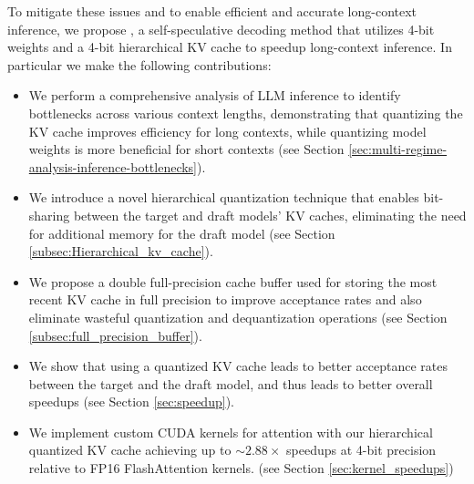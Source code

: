 To mitigate these issues and to enable efficient and accurate long-context inference, we propose \OURS, a self-speculative decoding method that utilizes 4-bit weights and a 4-bit hierarchical KV cache to speedup long-context inference. In particular we make the following contributions: 
\begin{itemize}
    \item We perform a comprehensive analysis of LLM inference to identify bottlenecks across various context lengths, demonstrating that quantizing the KV cache improves efficiency for long contexts, while quantizing model weights is more beneficial for short contexts (see Section \ref{sec:multi-regime-analysis-inference-bottlenecks}).
    \item We introduce a novel hierarchical quantization technique that enables bit-sharing between the target and draft models' KV caches, eliminating the need for additional memory for the draft model (see Section \ref{subsec:Hierarchical_kv_cache}).
    \item We propose a double full-precision cache buffer used for storing the most recent KV cache in full precision to improve acceptance rates and also eliminate wasteful quantization and dequantization operations (see Section \ref{subsec:full_precision_buffer}).
    \item We show that using a quantized KV cache leads to better acceptance rates between the target and the draft model, and thus leads to better overall speedups (see Section \ref{sec:speedup}).
    \item We implement custom CUDA kernels for attention with our hierarchical quantized KV cache achieving up to $\sim 2.88 \times$ speedups at 4-bit precision relative to FP16 FlashAttention kernels. (see Section \ref{sec:kernel_speedups})
\end{itemize}